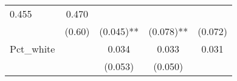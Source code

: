 \documentclass[12pt,twoside]{reedthesis}
\begin{document}
\begin{longtable}[]{@{}lcccc@{}}
\begin{minipage}[t]{0.20\columnwidth}
  0.455\strut
  \end{minipage} & \begin{minipage}[t]{0.11\columnwidth}\centering\strut
  0.470\strut
  \end{minipage}\tabularnewline
  \begin{minipage}[t]{0.23\columnwidth}\raggedright\strut
  \strut
  \end{minipage} & \begin{minipage}[t]{0.14\columnwidth}\centering\strut
  (0.60)\strut
  \end{minipage} & \begin{minipage}[t]{0.18\columnwidth}\centering\strut
  (0.045)**\strut
  \end{minipage} & \begin{minipage}[t]{0.20\columnwidth}\centering\strut
  (0.078)**\strut
  \end{minipage} & \begin{minipage}[t]{0.11\columnwidth}\centering\strut
  (0.072)\strut
  \end{minipage}\tabularnewline
  \begin{minipage}[t]{0.23\columnwidth}\raggedright\strut
  Pct\_white\strut
  \end{minipage} & \begin{minipage}[t]{0.14\columnwidth}\centering\strut
  \strut
  \end{minipage} & \begin{minipage}[t]{0.18\columnwidth}\centering\strut
  0.034\strut
  \end{minipage} & \begin{minipage}[t]{0.20\columnwidth}\centering\strut
  0.033\strut
  \end{minipage} & \begin{minipage}[t]{0.11\columnwidth}\centering\strut
  0.031\strut
  \end{minipage}\tabularnewline
  \begin{minipage}[t]{0.23\columnwidth}\raggedright\strut
  \strut
  \end{minipage} & \begin{minipage}[t]{0.14\columnwidth}\centering\strut
  \strut
  \end{minipage} & \begin{minipage}[t]{0.18\columnwidth}\centering\strut
  (0.053)\strut
  \end{minipage} & \begin{minipage}[t]{0.20\columnwidth}\centering\strut
  (0.050)\strut
  \end{minipage} & \begin{minipage}[t]{0.11\columnwidth}\centering\strut

\end{minipage}
\end{longtable}
\end{document}
